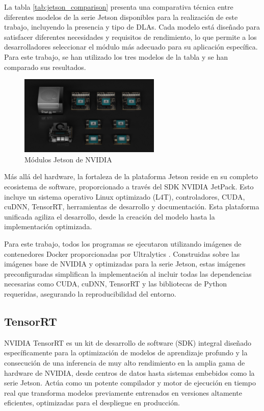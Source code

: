 \documentclass[11pt,spanish,listoffigures,listoftables]{tfgetsinf}
\begin{document}
La tabla \ref{tab:jetson_comparison}\cite{nvidia_jetson_modules} presenta una comparativa técnica entre diferentes modelos de la serie Jetson disponibles para la realización de este trabajo, incluyendo la presencia y tipo de DLAs. Cada modelo está diseñado para satisfacer diferentes necesidades y requisitos de rendimiento, lo que permite a los desarrolladores seleccionar el módulo más adecuado para su aplicación específica. Para este trabajo, se han utilizado los tres modelos de la tabla y se han comparado sus resultados.


\begin{figure}[H]
   \centering
   \includegraphics[width=0.6\textwidth]{images/estado_del_arte/jetson_family.png}
   \caption[Módulos Jetson de NVIDIA]{Módulos Jetson de NVIDIA}
   \label{fig:jetson_modules}
\end{figure}


Más allá del hardware, la fortaleza de la plataforma Jetson reside en su completo ecosistema de software, proporcionado a través del SDK NVIDIA JetPack. Esto incluye un sistema operativo Linux optimizado (L4T), controladores, CUDA, cuDNN, TensorRT, herramientas de desarrollo y documentación. Esta plataforma unificada agiliza el desarrollo, desde la creación del modelo hasta la implementación optimizada.

Para este trabajo, todos los programas se ejecutaron utilizando imágenes de contenedores Docker proporcionadas por Ultralytics \cite{Jocher_Ultralytics_YOLO_2023}. Construidas sobre las imágenes base de NVIDIA y optimizadas para la serie Jetson, estas imágenes preconfiguradas simplifican la implementación al incluir todas las dependencias necesarias como CUDA, cuDNN, TensorRT y las bibliotecas de Python requeridas, asegurando la reproducibilidad del entorno.

\subsection{TensorRT} \label{sec:tensorrt}
NVIDIA TensorRT es un kit de desarrollo de software (SDK) integral diseñado específicamente para la optimización de modelos de aprendizaje profundo y la consecución de una inferencia de muy alto rendimiento en la amplia gama de hardware de NVIDIA, desde centros de datos hasta sistemas embebidos como la serie Jetson. Actúa como un potente compilador y motor de ejecución en tiempo real que transforma modelos previamente entrenados en versiones altamente eficientes, optimizadas para el despliegue en producción.
\end{document}
